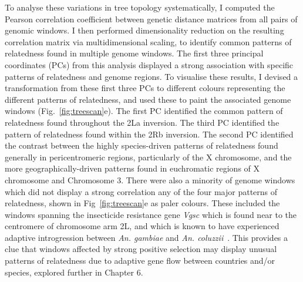 \begin{refsection}
To analyse these variations in tree topology systematically, I computed the Pearson correlation coefficient between genetic distance matrices from all pairs of genomic windows.
%
I then performed dimensionality reduction on the resulting correlation matrix via multidimensional scaling, to identify common patterns of relatedness found in multiple genome windows.
%
The first three principal coordinates (PCs) from this analysis displayed a strong association with specific patterns of relatedness and genome regions.
%
To visualise these results, I devised a transformation from these first three PCs to different colours representing the different patterns of relatedness, and used these to paint the associated genome windows (Fig.~\ref{fig:treescan}e).
%
The first PC identified the common pattern of relatedness found throughout the 2La inversion.
%
The third PC identified the pattern of relatedness found within the 2Rb inversion.
%
The second PC identified the contrast between the highly species-driven patterns of relatedness found generally in pericentromeric regions, particularly of the X chromosome, and the more geographically-driven patterns found in euchromatic regions of X chromosome and Chromosome 3.
%
There were also a minority of genome windows which did not display a strong correlation any of the four major patterns of relatedness, shown in Fig~\ref{fig:treescan}e as paler colours.
%
These included the windows spanning the insecticide resistance gene \textit{Vgsc} which is found near to the centromere of chromosome arm 2L, and which is known to have experienced adaptive introgression between \textit{An. gambiae} and \textit{An. coluzzii}~\parencite{Clarkson2014,Norris2015}.
%
This provides a clue that windows affected by strong positive selection may display unusual patterns of relatedness due to adaptive gene flow between countries and/or species, explored further in Chapter 6.



\end{refsection}
